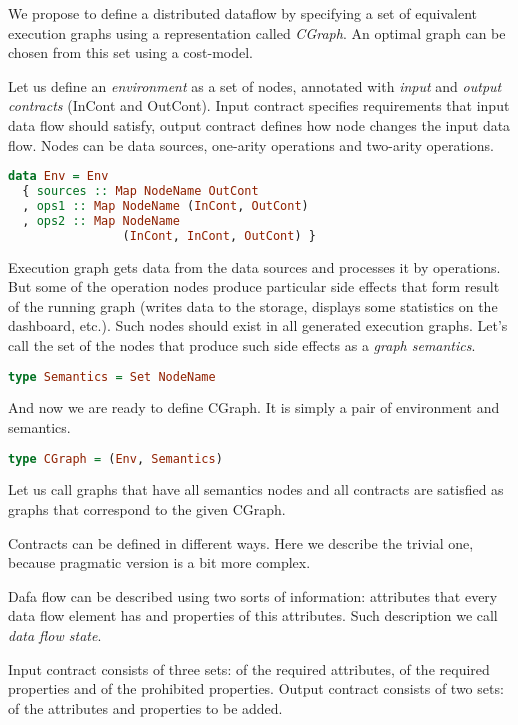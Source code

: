 We propose to define a distributed dataflow by specifying a set of equivalent execution graphs using a representation called {\em CGraph}.
An optimal graph can be chosen from this set using a cost-model.

Let us define an {\em environment} as a set of nodes, annotated with {\em input} and {\em output contracts} (InCont and OutCont).
Input contract specifies requirements that input data flow should satisfy, output contract defines how node changes the input data flow.
Nodes can be data sources, one-arity operations and two-arity operations.

\begin{lstlisting}[language=Haskell]
data Env = Env
  { sources :: Map NodeName OutCont
  , ops1 :: Map NodeName (InCont, OutCont)
  , ops2 :: Map NodeName
                (InCont, InCont, OutCont) }
\end{lstlisting}

Execution graph gets data from the data sources and processes it by operations.
But some of the operation nodes produce particular side effects that form result of the running graph (writes data to the storage, displays some statistics on the dashboard, etc.).
Such nodes should exist in all generated execution graphs.
Let's call the set of the nodes that produce such side effects as a {\em graph semantics}.

\begin{lstlisting}[language=Haskell]
type Semantics = Set NodeName
\end{lstlisting}

And now we are ready to define CGraph.
It is simply a pair of environment and semantics.

\begin{lstlisting}[language=Haskell]
type CGraph = (Env, Semantics)
\end{lstlisting}

Let us call graphs that have all semantics nodes and all contracts are satisfied as graphs that correspond to the given CGraph.

Contracts can be defined in different ways.
Here we describe the trivial one, because pragmatic version is a bit more complex.

Dafa flow can be described using two sorts of information: attributes that every data flow element has and properties of this attributes.
Such description we call {\em data flow state}.

Input contract consists of three sets: of the required attributes, of the required properties and of the prohibited properties.
Output contract consists of two sets: of the attributes and properties to be added.

